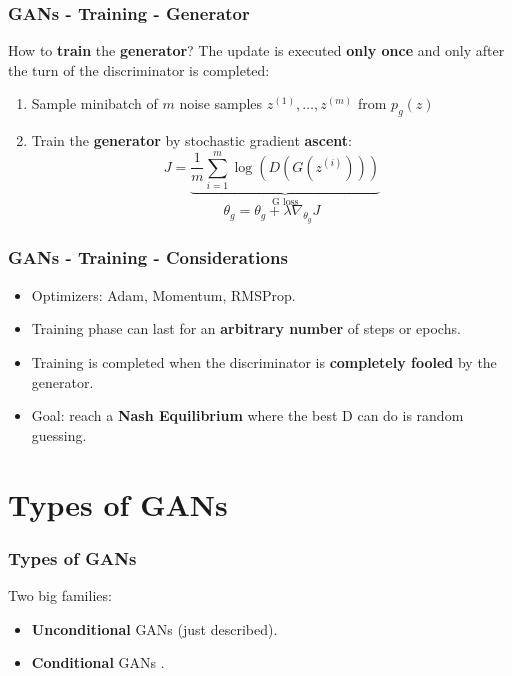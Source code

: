 \documentclass{beamer}
\begin{document}
\begin{frame}
	\frametitle{GANs - Training - Generator}
	How to \textbf{train} the \textbf{generator}? \newline
	The update is executed \textbf{only once} and only after the turn of the discriminator is completed:
	\begin{enumerate}
		\item<1-> \alert<+>{Sample minibatch of $m$ noise samples ${z^{(1)},\dots,z^{(m)}}$ from $p_g(z)$}
		\item<2-> \alert<+>{Train the \textbf{generator} by stochastic gradient \textbf{ascent}:
			$$
			J = \underbrace{\frac{1}{m} \sum_{i=1}^{m} \log(D(G(z^{(i)})))}_{\text{G loss}}
			$$
			$$
			\theta_g = \theta_g + \lambda \nabla_{\theta_g} J
			$$}
	\end{enumerate}
\end{frame} 

\begin{frame}
	\frametitle{GANs - Training - Considerations}
	\begin{itemize}
		\item Optimizers: Adam, Momentum, RMSProp.
		\item Training phase can last for an \textbf{arbitrary number} of steps or epochs.
		\item Training is completed when the discriminator is \textbf{completely fooled} by the generator.
		\item Goal: reach a \textbf{Nash Equilibrium} where the best D can do is random guessing.
	\end{itemize}
 \end{frame}
 
\section{Types of GANs}

\begin{frame}
	\frametitle{Types of GANs}
	Two big families:
	\begin{itemize}
		\item \textbf{Unconditional} GANs (just described).
		\item \textbf{Conditional} GANs \citep{mirzaConditionalGenerativeAdversarial2014}.
	\end{itemize}
\end{frame}
\end{document}
